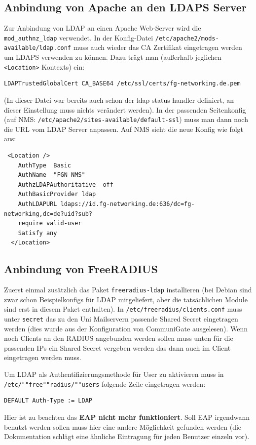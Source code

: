 \documentclass[11pt,a4paper,titlepage=firstiscover,headsepline,bibtotoc]{scrartcl} %
\begin{document}
\subsection{Anbindung von Apache an den LDAPS Server}
Zur Anbindung von LDAP an einen Apache Web-Server wird die \texttt{mod\_authnz\_ldap} verwendet. In der Konfig-Datei \texttt{/etc/apache2/mods-available/ldap.conf} muss auch wieder das CA Zertifikat eingetragen werden um LDAPS verwenden zu können. Dazu trägt man (außerhalb jeglichen \texttt{<Location>} Kontexts) ein:
\begin{lstlisting}
LDAPTrustedGlobalCert CA_BASE64 /etc/ssl/certs/fg-networking.de.pem
\end{lstlisting}
(In dieser Datei war bereits auch schon der ldap-status handler definiert, an dieser Einstellung muss nichts verändert werden). In der passenden Seitenkonfig (auf NMS: \texttt{/etc/apache2/sites-available/default-ssl}) muss man dann noch die URL vom LDAP Server anpassen. Auf NMS sieht die neue Konfig wie folgt aus:
\begin{lstlisting}
 <Location />
    AuthType  Basic
    AuthName  "FGN NMS"
    AuthzLDAPAuthoritative  off
    AuthBasicProvider ldap
    AuthLDAPURL ldaps://id.fg-networking.de:636/dc=fg-networking,dc=de?uid?sub?
    require valid-user
    Satisfy any
  </Location>
\end{lstlisting}


\subsection{Anbindung von FreeRADIUS}
Zuerst einmal zusätzlich das Paket \texttt{freeradius-ldap} installieren (bei Debian sind zwar schon Beispielkonfigs für LDAP mitgeliefert, aber die tatsächlichen Module sind erst in diesem Paket enthalten). In \texttt{/etc/freeradius/clients.conf} muss unter \texttt{secret} das zu den Uni Mailservern passende Shared Secret eingetragen werden (dies wurde aus der Konfiguration von CommuniGate ausgelesen). Wenn noch Clients an den RADIUS angebunden werden sollen muss unten für die passenden IPs ein Shared Secret vergeben werden das dann auch im Client eingetragen werden muss.

Um LDAP als Authentifizierungsmethode für User zu aktivieren muss in \texttt{/etc/""free""radius/""users} folgende Zeile eingetragen werden:
\begin{lstlisting}
DEFAULT Auth-Type := LDAP
\end{lstlisting}
Hier ist zu beachten das \textbf{EAP nicht mehr funktioniert}. Soll EAP irgendwann benutzt werden sollen muss hier eine andere Möglichkeit gefunden werden (die Dokumentation schlägt eine ähnliche Eintragung für jeden Benutzer einzeln vor).
\end{document}
